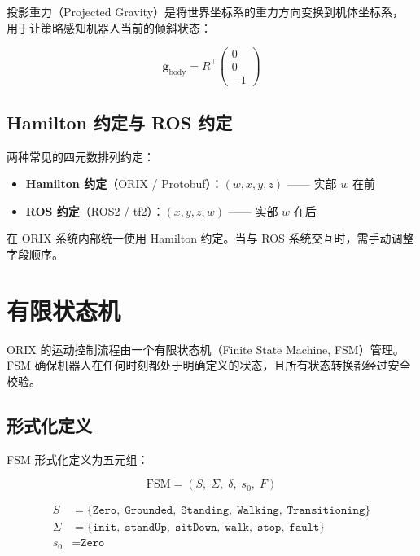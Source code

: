 \documentclass[a4paper,11pt,openany]{book}
\begin{document}
投影重力（Projected Gravity）是将世界坐标系的重力方向变换到机体坐标系，
用于让策略感知机器人当前的倾斜状态：

\begin{equation}
\mathbf{g}_{\mathrm{body}} = R^\top \begin{pmatrix} 0 \\ 0 \\ -1 \end{pmatrix}
\end{equation}

\subsection{Hamilton 约定与 ROS 约定}

两种常见的四元数排列约定：

\begin{itemize}[nosep]
  \item \textbf{Hamilton 约定}（ORIX / Protobuf）：$(w, x, y, z)$ ------ 实部 $w$ 在前
  \item \textbf{ROS 约定}（ROS2 / tf2）：$(x, y, z, w)$ ------ 实部 $w$ 在后
\end{itemize}

在 ORIX 系统内部统一使用 Hamilton 约定。当与 ROS 系统交互时，需手动调整字段顺序。

\section{有限状态机}
\label{sec:fsm-theory}

ORIX 的运动控制流程由一个有限状态机（Finite State Machine, FSM）管理。
FSM 确保机器人在任何时刻都处于明确定义的状态，且所有状态转换都经过安全校验。

\subsection{形式化定义}

FSM 形式化定义为五元组：

\begin{equation}
\mathrm{FSM} = (S,\; \Sigma,\; \delta,\; s_0,\; F)
\end{equation}

\begin{align}
S      &= \{\texttt{Zero},\; \texttt{Grounded},\; \texttt{Standing},\; \texttt{Walking},\; \texttt{Transitioning}\} \\
\Sigma &= \{\texttt{init},\; \texttt{standUp},\; \texttt{sitDown},\; \texttt{walk},\; \texttt{stop},\; \texttt{fault}\} \\
s_0    &= \texttt{Zero}
\end{align}
\end{document}
